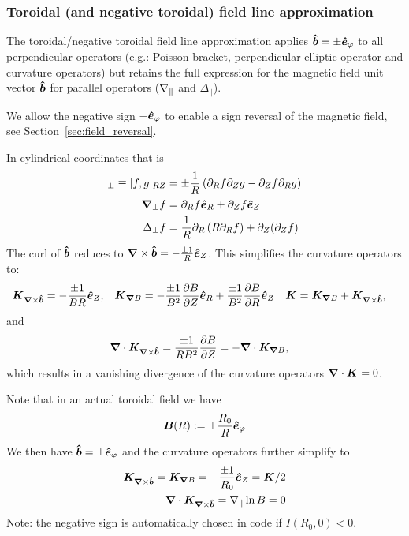 \subsubsection{Toroidal (and negative toroidal) field line approximation}\label{sec:torfieldlineapprox}
The toroidal/negative toroidal field line approximation applies \(\bm{\hat{b}}= \pm \bm{\hat{e}}_\varphi\) to all perpendicular operators
(e.g.: Poisson bracket, perpendicular elliptic operator and curvature operators)
but retains the full expression for the magnetic field unit vector \(\bm{\hat{b}}\)
for parallel operators (\(\nabla_\parallel\) and \(\Delta_\parallel\)).
\begin{tcolorbox}[title=Note]
We allow the negative sign $-\bm{\hat{e}}_\varphi$ to enable a sign reversal of the magnetic field, see Section~\ref{sec:field_reversal}.
\end{tcolorbox}
In cylindrical coordinates that is
\begin{align}
[f,g]_\perp \equiv [f,g]_{RZ} &= \pm\frac{1}{R} \left(\partial_R f\partial_Z g - \partial_Z f\partial_R g\right) \\
\np f &= \partial_R f \ehat_R + \partial_Z f \ehat_Z \\
\Delta_\perp f &= \frac{1}{R}\partial_R \left( R \partial_R f\right) + \partial_Z(\partial_Z f)
\label{}
\end{align}
The curl of $\bm{\hat{b}}$ reduces to
 ${\boldsymbol{\nabla}}\times\bm{\hat{b}} = -  \frac{\pm 1}{R} \bm{\hat{e}}_Z$.
This simplifies the curvature operators to:
\begin{align}
{\boldsymbol{{K}}}_{{{\boldsymbol{\nabla}}\times\bm{\hat{b}}}}  &=  -  \frac{\pm 1}{B R} \bm{\hat{e}}_Z , &
{\boldsymbol{ {K} }}_{{\boldsymbol{\nabla}}  B}  &=  -\frac{\pm 1}{B^2}\frac{\partial B}{\partial Z}\bm{\hat{e}}_R +\frac{\pm 1}{B^2} \frac{\partial B}{\partial R}\bm{\hat{e}}_Z &
{\boldsymbol{ {K} }} &= {{\boldsymbol{K}}_{{\boldsymbol{\nabla}} B}}  +{{\boldsymbol{K}}_{{\boldsymbol{\nabla}}\times\bm{\hat{b}}}} ,
\end{align}
and
\begin{align}
    {\boldsymbol{\nabla}}\cdot {{\boldsymbol{K}}_{{\boldsymbol{\nabla}}\times\bm{\hat{b}}}} &= \frac{\pm 1}{R B^2} \frac{\partial B}{\partial Z} = -{\boldsymbol{\nabla}}\cdot {{\boldsymbol{K}}_{{\boldsymbol{\nabla}}B}},
\end{align}
which results in a vanishing divergence of the curvature operators \( {\boldsymbol{\nabla}}\cdot {\boldsymbol{ {K} }} = 0\).

Note that in an actual toroidal field we have
\begin{align}
  {\boldsymbol{B}}(R) := \pm \frac{R_0}{R} \bm{\hat{e}}_\varphi
  \label{}
\end{align}
We then have $\bm{\hat{b}} = \pm\bm{\hat{e}}_\varphi$ and the curvature operators further
simplify to
\begin{align}
  {{\boldsymbol{K}}_{{\boldsymbol{\nabla}}\times\bm{\hat{b}}}} = {{\boldsymbol{K}}_{{\boldsymbol{\nabla}} B}} = -\frac{\pm 1}{R_0} \bm{\hat{e}}_Z =
{\boldsymbol{  K}}/2\\
  {\boldsymbol{\nabla}}\cdot{{\boldsymbol{K}}_{{\boldsymbol{\nabla}}\times\bm{\hat{b}}}}=
    \nabla_\parallel \ln B = 0
    \label{}
\end{align}
Note: the negative sign is automatically chosen in code if $I(R_0, 0)<0$.

